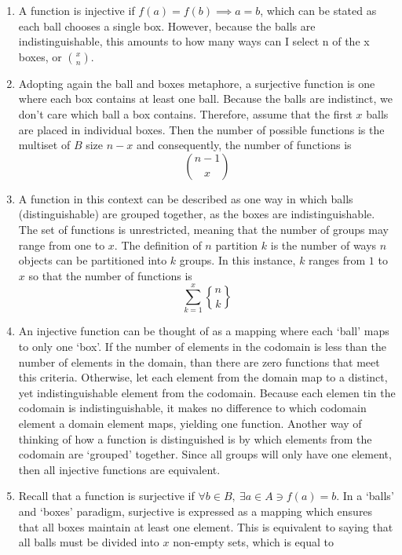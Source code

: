 \documentclass{article}
\begin{document}
\begin{enumerate}
\item A function is injective if $f(a) = f(b) \implies a = b$, which can be stated as each ball chooses a single box. However, because the balls are indistinguishable, this amounts to how many ways can I select n of the x boxes, or ${x \choose n}$.
\item Adopting again the ball and boxes metaphore, a surjective function is one where each box contains at least one ball. Because the balls are indistinct, we don't care which ball a box contains. Therefore, assume that the first $x$ balls are placed in individual boxes. Then the number of possible functions is the multiset of $B$ size $n - x$ and consequently, the number of functions is 
\begin{equation*}
	{n - 1 \choose x}
\end{equation*} 
\item A function in this context can be described as one way in which balls (distinguishable) are grouped together, as the boxes are indistinguishable. The set of functions is unrestricted, meaning that the number of groups may range from one to $x$.  The definition of $n$ partition $k$ is the number of ways $n$ objects can be partitioned into $k$ groups.  In this instance, $k$ ranges from $1$ to $x$ so that the number of functions is 
	\begin{equation*}
		\sum_{k=1}^x {n \brace k}
	\end{equation*}
\item An injective function can be thought of as a mapping where each `ball' maps to only one `box'.  If the number of elements in the codomain is less than the number of elements in the domain, than there are zero functions that meet this criteria. Otherwise, let each element from the domain map to a distinct, yet indistinguishable element from the codomain. Because each elemen tin the codomain is indistinguishable, it makes no difference to which codomain element a domain element maps, yielding one function. Another way of thinking of how a function is distinguished is by which elements from the codomain are `grouped' together.  Since all groups will only have one element, then all injective functions are equivalent. 
\item Recall that a function is surjective if $\forall b \in B, \ \exists a \in A \ni f(a) = b$. In a `balls' and `boxes' paradigm, surjective is expressed as a mapping which ensures that all boxes maintain at least one element. This is equivalent to saying that all balls must be divided into $x$ non-empty sets, which is equal to 

\end{enumerate}
\end{document}
